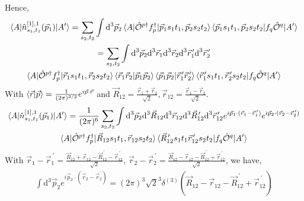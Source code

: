 \documentclass[10pt]{article}
\begin{document}
Hence,
\begin{multline*}
	\braket{ A | \hat{n}_{s_1,t_1}^{[1],1}(\vec{p}_1) | A'} = 
\sum_{s_2,t_2} \int \text{d}^{3} \vec{p}_{2} \braket{ A | 
\hat{\mathcal{O}}^{p\dagger} f_{p}^{\dagger} | \vec{p}_1 s_1 t_1, \vec{p}_2 s_2 
t_2 } \braket{ \vec{p}_1 s_1 t_1, \vec{p}_2 s_2 t_2 | f_{q} \hat{ 
\mathcal{O}}^{q} | A'} \\
	=  \sum_{s_2,t_2} \int \text{d}^{3} \vec{p}_{2} \text{d}^{3} 
\vec{r}_{1} \text{d}^{3} \vec{r}_{2} \text{d}^{3} \vec{r}_{1}^{\, \prime} 
\text{d}^{3} \vec{r}_{2}^{\, \prime} \\
	 \braket{ A | \hat{\mathcal{O}}^{p\dagger} f_{p}^{\dagger} | 
\vec{r}_{1} s_1 t_1, \vec{r}_{2} s_2 t_2 } \braket{ \vec{r}_1 \vec{r}_2 | 
\vec{p}_1 \vec{p}_2 } \braket{ \vec{p}_1 \vec{p}_2 | \vec{r}_{1}^{\, \prime} 
\vec{r}_{2}^{\, \prime} } \braket{ \vec{r}_{1}^{\, \prime} s_1 t_1 , 
\vec{r}_{2}^{\, \prime} s_2 t_2 | f_{q} \hat{ \mathcal{O}}^{q} | A'}
\end{multline*}
With $\braket{ \vec{r} | \vec{p} } = \frac{1}{(2 \pi)^{3/2}} e^{i \vec{p} \cdot 
\vec{r}}$ and $ \vec{R}_{12} = \frac{\vec{r}_{1} + \vec{r}_{2}}{\sqrt{2}}, 
\vec{r}_{12} = \frac{\vec{r}_{1} - \vec{r}_{2}}{\sqrt{2}}$.
\begin{multline*}
	\braket{ A | \hat{n}_{s_1,t_1}^{[1],1}(\vec{p}_1) | A'} =  \frac{1}{(2 
\pi)^{6}} \sum_{s_2,t_2} \int \text{d}^{3} \vec{p}_{2} \text{d}^{3} 
\vec{R}_{12} \text{d}^{3} \vec{r}_{12} \text{d}^{3} \vec{R}_{12}^{\, \prime} 
\text{d}^{3} \vec{r}_{12}^{\, \prime}  e^{ i \vec{p}_{1} \cdot ( \vec{r}_{1} - 
\vec{r}_{1}^{\, \prime}) } e^{ i \vec{p}_{2} \cdot ( \vec{r}_{2} - 
\vec{r}_{2}^{\, \prime} )} \\
	\braket{ A | \hat{\mathcal{O}}^{p\dagger} f_{p}^{\dagger} | 
\vec{R}_{12} s_1 t_1, \vec{r}_{12} s_2 t_2 } \braket{ \vec{R}_{12}^{\, \prime} 
s_1 t_1 \vec{r}_{12}^{\, \prime} s_2 t_2 | f_{q} \hat{ \mathcal{O}}^{q} | A'}
\end{multline*}
With $ \vec{r}_{1} - \vec{r}_{1}^{\, \prime} = \frac{\vec{R}_{12} + 
\vec{r}_{12} - \vec{R}_{12}^{\, \prime} - \vec{r}_{12}^{\, \prime}}{\sqrt{2}}$, 
$\vec{r}_{2} - \vec{r}_{2}^{\, \prime} = \frac{\vec{R}_{12} - \vec{r}_{12} - 
\vec{R}_{12}^{\, \prime} + \vec{r}_{12}^{\, \prime}}{\sqrt{2}}$, we have,
\begin{align*}
	\int \text{d}^{3} \vec{p}_{2} e^{ i \vec{p}_{2} \cdot ( \vec{r}_{2} - 
\vec{r}_{2}^{\, \prime} )} = (2 \pi)^{3} \sqrt{2}^{3} \delta^{(3)}( 
\vec{R}_{12} - \vec{r}_{12} - \vec{R}_{12}^{\, \prime} + \vec{r}_{12}^{\, 
\prime} )
\end{align*}
\end{document}
